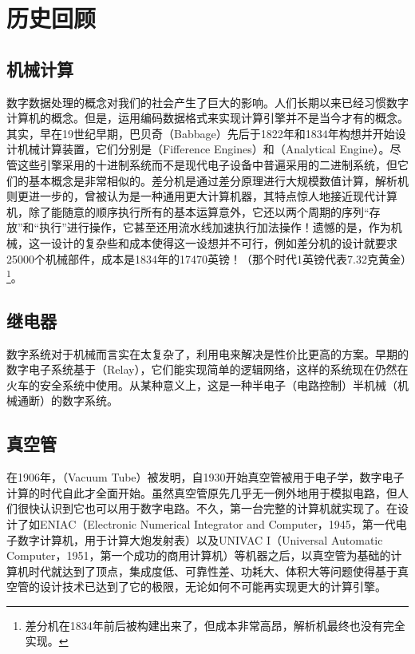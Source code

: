 \section{历史回顾}

\subsection{机械计算}
数字数据处理的概念对我们的社会产生了巨大的影响。人们长期以来已经习惯数字计算机的概念。但是，运用编码数据格式来实现计算引擎并不是当今才有的概念。其实，早在19世纪早期，巴贝奇（Babbage）先后于1822年和1834年构想并开始设计机械计算装置，它们分别是（Fifference Engines）和（Analytical Engine）。尽管这些引擎采用的十进制系统而不是现代电子设备中普遍采用的二进制系统，但它们的基本概念是非常相似的。差分机是通过差分原理进行大规模数值计算，解析机则更进一步的，曾被认为是一种通用更大计算机器，其特点惊人地接近现代计算机，除了能随意的顺序执行所有的基本运算意外，它还以两个周期的序列“存放”和“执行”进行操作，它甚至还用流水线加速执行加法操作！遗憾的是，作为机械，这一设计的复杂些和成本使得这一设想并不可行，例如差分机的设计就要求25000个机械部件，成本是1834年的17470英镑！（那个时代1英镑代表7.32克黄金）\footnote{差分机在1834年前后被构建出来了，但成本非常高昂，解析机最终也没有完全实现。}。

\subsection{继电器}
数字系统对于机械而言实在太复杂了，利用电来解决是性价比更高的方案。早期的数字电子系统基于（Relay），它们能实现简单的逻辑网络，这样的系统现在仍然在火车的安全系统中使用。从某种意义上，这是一种半电子（电路控制）半机械（机械通断）的数字系统。

\subsection{真空管}
在1906年，（Vacuum Tube）被发明，自1930开始真空管被用于电子学，数字电子计算的时代自此才全面开始。虽然真空管原先几乎无一例外地用于模拟电路，但人们很快认识到它也可以用于数字电路。不久，第一台完整的计算机就实现了。在设计了如ENIAC（Electronic Numerical Integrator and Computer，1945，第一代电子数字计算机，用于计算大炮发射表）以及UNIVAC I（Universal Automatic Computer，1951，第一个成功的商用计算机）等机器之后，以真空管为基础的计算机时代就达到了顶点，集成度低、可靠性差、功耗大、体积大等问题使得基于真空管的设计技术已达到了它的极限，无论如何不可能再实现更大的计算引擎。

